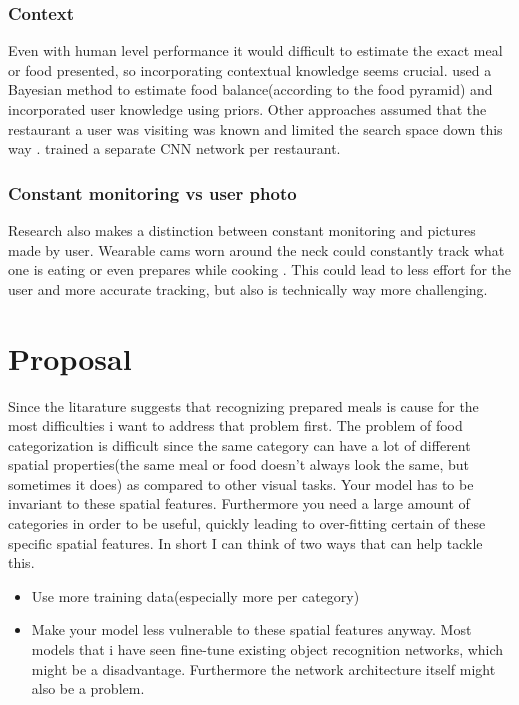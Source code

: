 \documentclass[a4paper]{scrartcl}
\begin{document}
\subsubsection{Context}
Even with human level performance it would difficult to estimate the exact meal or food presented, so incorporating contextual knowledge seems crucial.  used a Bayesian method to estimate food balance(according to the food pyramid) and incorporated user knowledge using priors.  Other approaches assumed that the restaurant a user was visiting was known and limited the search space down this way \cite{joutou2009food}.  trained a separate CNN network per restaurant.
\subsubsection{Constant monitoring vs user photo}
Research also makes a distinction between constant monitoring and pictures made by user. Wearable cams worn around the neck could constantly track what one is eating or even prepares while cooking \cite{o2013using, liu2012intelligent,jia2014accuracy}. This could lead to less effort for the user and more accurate tracking, but also is technically way more challenging. 
\cite{horiguchi2016log}

\newpage
\section{Proposal}
Since the litarature suggests that recognizing prepared meals is cause for the most difficulties i want to address that problem first. The problem of food categorization is difficult since the same category can have a lot of different spatial properties(the same meal or food doesn't always look the same, but sometimes it does) as compared to other visual tasks. Your model has to be invariant to these spatial features. Furthermore you need a large amount of categories in order to be useful, quickly leading to over-fitting certain of these specific spatial features. In short I can think of two ways that can help tackle this. 
\begin{itemize}
\item Use more training data(especially more per category)
\item Make your model less vulnerable  to these spatial features anyway. Most models that i have seen fine-tune existing object recognition networks, which might be a disadvantage. Furthermore the network architecture itself might also be a problem. 
\end{itemize}
\end{document}
